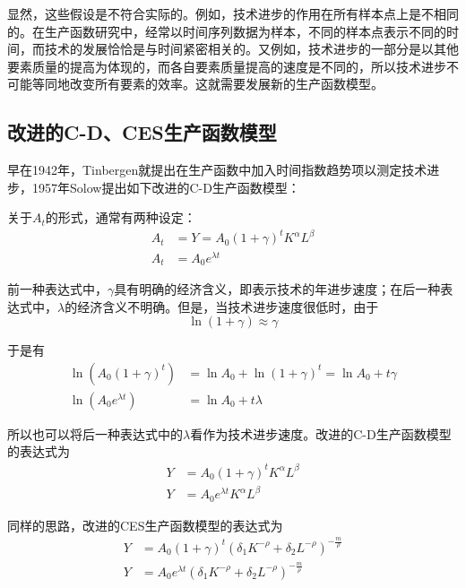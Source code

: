 	显然，这些假设是不符合实际的。例如，技术进步的作用在所有样本点上是不相同的。在生产函数研究中，经常以时间序列数据为样本，不同的样本点表示不同的时间，而技术的发展恰恰是与时间紧密相关的。又例如，技术进步的一部分是以其他要素质量的提高为体现的，而各自要素质量提高的速度是不同的，所以技术进步不可能等同地改变所有要素的效率。这就需要发展新的生产函数模型。
		
\subsection{改进的C-D、CES生产函数模型}
		
	早在1942年，Tinbergen就提出在生产函数中加入时间指数趋势项以测定技术进步，1957年Solow提出如下改进的C-D生产函数模型：
		
	关于$ A_{t} $的形式，通常有两种设定：
	\begin{align*}
		A_{t} & = Y=A_{0}\left ( 1+\gamma  \right ) ^{t}K^{\alpha }L^{\beta } \\
		A_{t} & = A_{0}e^{\lambda t}
	\end{align*}

	前一种表达式中，$ \gamma $具有明确的经济含义，即表示技术的年进步速度；在后一种表达式中，$ \lambda $的经济含义不明确。但是，当技术进步速度很低时，由于
	$$ \ln\left ( 1+\gamma  \right ) \approx \gamma $$

	于是有
	\begin{align*}
		\ln\left ( A_{0}\left ( 1+\gamma  \right ) ^{t}\right ) & = \ln A_{0} + \ln\left ( 1+\gamma  \right )^{t} = \ln A_{0} + t\gamma \\
		\ln\left (A_{0}e^{\lambda t}\right ) & = \ln A_{0} + t\lambda 		
	\end{align*}

	所以也可以将后一种表达式中的$ \lambda $看作为技术进步速度。改进的C-D生产函数模型的表达式为
	\begin{align}
		Y & = A_{0}\left ( 1+\gamma  \right ) ^{t}K^{\alpha }L^{\beta } \label{eq (22)} \\
		Y & = A_{0}e^{\lambda t}K^{\alpha }L^{\beta } \label{eq (23)}
	\end{align}
		
	同样的思路，改进的CES生产函数模型的表达式为
	\begin{align}
		Y & = A_{0}(1+\gamma)^{t}\left(\delta_{1} K^{-\rho}+\delta_{2} L^{-\rho}\right)^{-\frac{m}{\rho}} \label{eq (24)} \\		
		Y & = A_{0} e^{\lambda t}\left(\delta_{1} K^{-\rho}+\delta_{2} L^{-\rho}\right)^{-\frac{m}{\rho}}  \label{eq (25)}
	\end{align}
		
